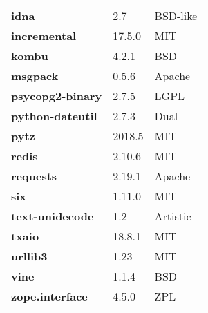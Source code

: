\begin{longtable}{| p{} | p{} | p{} |}
\textbf{idna} & 2.7 & BSD-like \\
\textbf{incremental} & 17.5.0 & MIT \\
\textbf{kombu} & 4.2.1 & BSD \\
\textbf{msgpack} & 0.5.6 & Apache \\
\textbf{psycopg2-binary} & 2.7.5 & LGPL \\
\textbf{python-dateutil} & 2.7.3 & Dual \\
\textbf{pytz} & 2018.5 & MIT \\
\textbf{redis} & 2.10.6 & MIT \\
\textbf{requests} & 2.19.1 & Apache \\
\textbf{six} & 1.11.0 & MIT \\
\textbf{text-unidecode} & 1.2 & Artistic \\
\textbf{txaio} & 18.8.1 & MIT \\
\textbf{urllib3} & 1.23 & MIT \\
\textbf{vine} & 1.1.4 & BSD \\
\textbf{zope.interface} & 4.5.0 & ZPL \\
\hline
\end{longtable}
